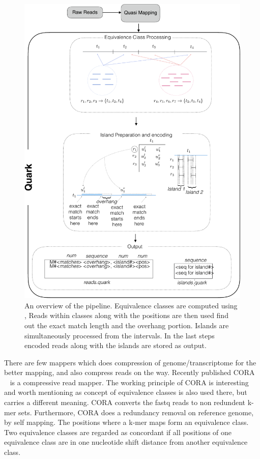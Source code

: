 \begin{figure}[!ht]
\includegraphics[width=\textwidth]{Figures/quark_overview4-crop}
\centering
\caption{\label{fig:overview_quark}An overview of the \quark pipeline. Equivalence classes are computed using \qm, Reads within classes along with the positions are then used find out the exact match length and the overhang portion. Islands are simultaneously processed from the intervals. In the last steps encoded reads along with the islands are stored as \quark output.}
\end{figure}


There are few mappers which does compression of genome/transcriptome for the better mapping, and also compress reads on the way. Recently published CORA ~\citep{Yorukoglu2016} is a compressive read mapper. The working principle of CORA is interesting and worth mentioning as concept of equivalence classes is also used there, but carries a different meaning. CORA converts the fastq reads to non redundent k-mer sets. Furthermore, CORA does a redundancy removal on reference genome, by self mapping. The positions where a k-mer maps form an equivalence class. Two equivalence classes are regarded as concordant if all positions of one equivalence class are in one nucleotide shift distance from another equivalence class. 

